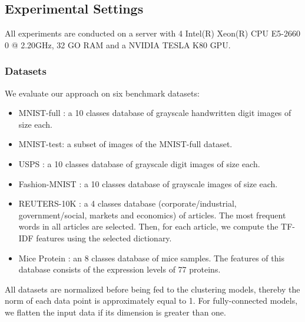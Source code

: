 \documentclass{article}
\begin{document}
\subsection{Experimental Settings}
All experiments are conducted on a server with 4 Intel(R) Xeon(R) CPU E5-2660 0 @ 2.20GHz, 32 GO RAM and a NVIDIA TESLA K80 GPU.

\subsubsection{Datasets}
We evaluate our approach on six benchmark datasets:

\begin{itemize}
    \item MNIST-full \cite{paper38}: a 10 classes database of  grayscale handwritten digit images of size  each. 
    \item MNIST-test: a subset of  images of the MNIST-full dataset. 
    \item USPS \cite{paper39}: a 10 classes  database of  grayscale digit images of size  each. 
    \item Fashion-MNIST \cite{paper40}: a 10 classes database of  grayscale images of size  each.
    \item REUTERS-10K \cite{paper69}: a 4 classes database (corporate/industrial, government/social, markets and economics) of  articles. The  most frequent words in all articles are selected. Then, for each article, we compute the TF-IDF features using the selected dictionary.
    \item Mice Protein \cite{paper70}: an 8 classes database of  mice samples. The features of this database consists of the expression levels of 77 proteins. 
\end{itemize}

All datasets are normalized before being fed to the clustering models, thereby the norm of each data point  is approximately equal to 1. For fully-connected models, we flatten the input data if its dimension is greater than one.
\end{document}
